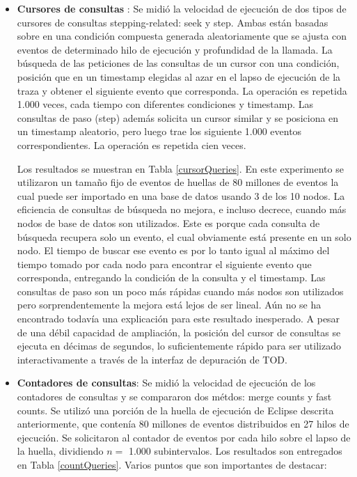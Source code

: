 \documentclass[12pt,legalpaper]{report}
\begin{document}
\begin{itemize}
	\item \textbf{Cursores de consultas} : Se midió la velocidad de ejecución de dos tipos de cursores de consultas stepping-related:  seek y step.  Ambas están basadas sobre en una condición compuesta generada aleatoriamente que se ajusta con eventos de determinado hilo de ejecución y profundidad de la llamada.  La búsqueda de las peticiones de las consultas de un cursor con una condición, posición que en un timestamp elegidas al azar en el lapso de ejecución de la traza y obtener el siguiente evento que corresponda.  La operación es repetida 1.000 veces, cada tiempo con diferentes condiciones y timestamp.  Las consultas de paso (step) además solicita un cursor similar y se posiciona en un timestamp aleatorio, pero luego trae los siguiente 1.000 eventos correspondientes.  La operación es repetida cien veces.
	
Los resultados se muestran en Tabla \ref{cursorQueries}.  En este experimento se utilizaron un tamaño fijo de eventos de huellas de 80 millones de eventos la cual puede ser importado en una base de datos usando 3 de los 10 nodos.  La eficiencia de consultas de búsqueda no mejora, e incluso decrece, cuando más nodos de base de datos son utilizados.  Este es porque cada consulta de búsqueda recupera solo un evento, el cual obviamente está presente en un solo nodo.  El tiempo de buscar ese evento es por lo tanto igual al máximo del tiempo tomado por cada nodo para encontrar el siguiente evento que corresponda, entregando la condición de la consulta y el timestamp. Las consultas de paso son un poco más rápidas cuando más nodos son utilizados pero sorprendentemente la mejora está lejos de ser lineal.  Aún no se ha encontrado todavía una explicación para este resultado inesperado.  A pesar de una débil capacidad de ampliación, la posición del cursor de consultas se ejecuta en décimas de segundos, lo suficientemente rápido para ser utilizado interactivamente a través de la interfaz de depuración de TOD.
		
	\item \textbf{Contadores de consultas}:  Se midió la velocidad de ejecución de los contadores de consultas y se compararon dos métdos: merge counts y fast counts.  Se utilizó una porción de la huella de ejecución de Eclipse descrita anteriormente, que contenía 80 millones de eventos distribuidos en 27 hilos de ejecución.  Se solicitaron al contador de eventos por cada hilo sobre el lapso de la huella, dividiendo $n =$ 1.000 subintervalos.  Los resultados son entregados en Tabla \ref{countQueries}.  Varios puntos que son importantes de destacar:


\end{itemize}
\end{document}
